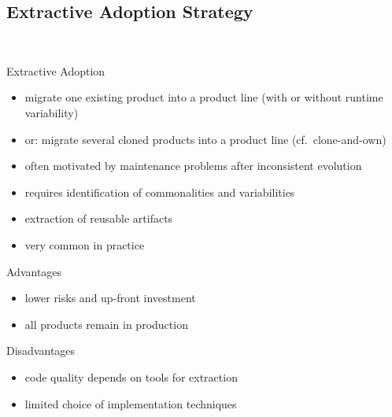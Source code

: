 \subsection{Extractive Adoption Strategy}
\begin{frame}{\myframetitle\ }
	\begin{fancycolumns}[animation=none]
		\begin{definition}{Extractive Adoption}
			\begin{itemize}
				\item migrate one existing product into a product line (with or without runtime variability)
				\item or: migrate several cloned products into a product line (cf.\ clone-and-own)
				\item often motivated by maintenance problems after inconsistent evolution
				\item requires identification of commonalities and variabilities
				\item extraction of reusable artifacts
				\item very common in practice
			\end{itemize}
		\end{definition}
	\nextcolumn
		\begin{note}{Advantages}
			\begin{itemize}
				\item lower risks and up-front investment
				\item all products remain in production
			\end{itemize}
		\end{note}
		\begin{note}{Disadvantages}
			\begin{itemize}
				\item code quality depends on tools for extraction
				\item limited choice of implementation techniques
			\end{itemize}
		\end{note}
	\end{fancycolumns}
\end{frame}

